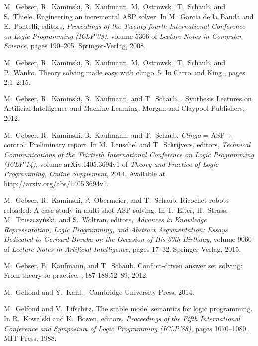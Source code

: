 \begin{thebibliography}{10}
M.~Gebser, R.~Kaminski, B.~Kaufmann, M.~Ostrowski, T.~Schaub, and S.~Thiele.
\newblock Engineering an incremental {ASP} solver.
\newblock In M.~{Garcia de la Banda} and E.~Pontelli, editors, {\em Proceedings
  of the Twenty-fourth International Conference on Logic Programming
  (ICLP'08)}, volume 5366 of {\em Lecture Notes in Computer Science}, pages
  190--205. Springer-Verlag, 2008.

M.~Gebser, R.~Kaminski, B.~Kaufmann, M.~Ostrowski, T.~Schaub, and P.~Wanko.
\newblock Theory solving made easy with clingo~5.
\newblock In Carro and King \cite{iclp-lipics16}, pages 2:1--2:15.

M.~Gebser, R.~Kaminski, B.~Kaufmann, and T.~Schaub.
.
\newblock Synthesis Lectures on Artificial Intelligence and Machine Learning.
  Morgan and Claypool Publishers, 2012.

M.~Gebser, R.~Kaminski, B.~Kaufmann, and T.~Schaub.
\newblock \textit{Clingo} = {ASP} + control: Preliminary report.
\newblock In M.~Leuschel and T.~Schrijvers, editors, {\em Technical
  Communications of the Thirtieth International Conference on Logic Programming
  (ICLP'14)}, volume arXiv:1405.3694v1 of {\em Theory and Practice of Logic
  Programming, Online Supplement}, 2014.
\newblock Available at \url{http://arxiv.org/abs/1405.3694v1}.

M.~Gebser, R.~Kaminski, P.~Obermeier, and T.~Schaub.
\newblock Ricochet robots reloaded: A case-study in multi-shot {ASP} solving.
\newblock In T.~Eiter, H.~Strass, M.~Truszczy{\'n}ski, and S.~Woltran, editors,
  {\em Advances in Knowledge Representation, Logic Programming, and Abstract
  Argumentation: Essays Dedicated to {G}erhard {B}rewka on the Occasion of His
  60th Birthday}, volume 9060 of {\em Lecture Notes in Artificial
  Intelligence}, pages 17--32. Springer-Verlag, 2015.

M.~Gebser, B.~Kaufmann, and T.~Schaub.
\newblock Conflict-driven answer set solving: From theory to practice.
, 187-188:52--89, 2012.

M.~Gelfond and Y.~Kahl.
.
\newblock Cambridge University Press, 2014.

M.~Gelfond and V.~Lifschitz.
\newblock The stable model semantics for logic programming.
\newblock In R.~Kowalski and K.~Bowen, editors, {\em Proceedings of the Fifth
  International Conference and Symposium of Logic Programming (ICLP'88)}, pages
  1070--1080. MIT Press, 1988.


\end{thebibliography}
